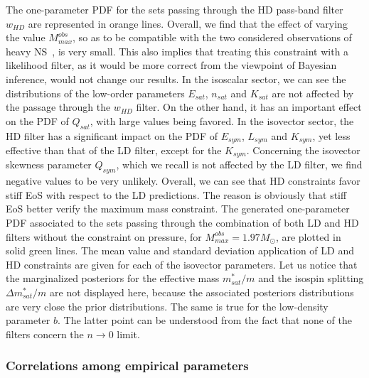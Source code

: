 The one-parameter PDF for the sets passing through the HD pass-band filter 
$w_{HD}$ are represented in orange lines. Overall, we find that the effect of
varying the value $M_{max}^{obs}$, so as to be compatible with the two 
considered observations of heavy NS~\cite{Antoniadis2013,Cromartie2020}, is 
very small. 
%
This also implies that treating this constraint with a likelihood filter, as it
would be more correct from the viewpoint of Bayesian inference, would not
change our results.
%
In the isoscalar sector, we can see the distributions of the 
low-order parameters $E_{sat}$, $n_{sat}$ and $K_{sat}$ are not affected 
by the passage through the $w_{HD}$ filter. On the other hand, it has an
important effect on the PDF of $Q_{sat}$, with large values being favored. In
the isovector sector, the HD filter has a significant impact on the PDF of
$E_{sym}$, $L_{sym}$ and $K_{sym}$, yet less effective than that of the LD 
filter, except for the $K_{sym}$. Concerning the isovector skewness parameter
$Q_{sym}$, which we recall is not affected by the LD filter, we find negative 
values to be very unlikely. 
Overall, we can see that HD constraints favor stiff EoS with respect to the LD 
predictions. The reason is obviously that stiff EoS better 
verify the maximum mass constraint.
%
The generated one-parameter PDF associated to the sets passing through the 
combination of both LD and HD filters without the constraint on pressure, 
for $M_{max}^{obs}=1.97M_\odot$, are plotted in solid green lines. The
mean value and standard deviation application of LD and HD constraints are 
given for each of the isovector parameters.
%
Let us notice that the marginalized posteriors for the effective mass 
$m_{sat}^*/m$ and the isospin splitting $\Delta m_{sat}^*/m$ are not displayed 
here, because the associated posteriors distributions are very close the prior 
distributions. The same is true for the low-density parameter 
$b$. The latter point can be understood from the fact that none of the filters 
concern the $n \rightarrow 0$ limit.

\subsubsection{Correlations among empirical parameters}\label{subsubsec:corr}

